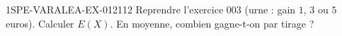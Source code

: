 \begin{exercice}{1SPE-VARALEA-EX-012}{1}{12}
Reprendre l'exercice 003 (urne : gain $1$, $3$ ou $5$ euros). Calculer $E(X)$. En moyenne, combien gagne-t-on par tirage ?
\end{exercice}
